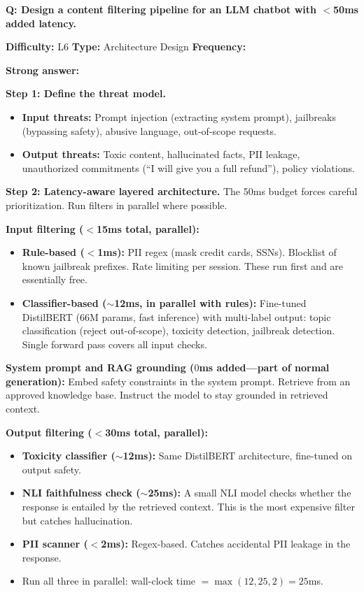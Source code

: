 \begin{interviewq}
\textbf{Q: Design a content filtering pipeline for an LLM chatbot with $<$50ms added latency.}

\textbf{Difficulty:} L6 \quad \textbf{Type:} Architecture Design \quad \textbf{Frequency:} \freqhigh{}

\textbf{Strong answer:}

\textbf{Step 1: Define the threat model.}
\begin{itemize}
    \item \textbf{Input threats:} Prompt injection (extracting system prompt), jailbreaks (bypassing safety), abusive language, out-of-scope requests.
    \item \textbf{Output threats:} Toxic content, hallucinated facts, PII leakage, unauthorized commitments (``I will give you a full refund''), policy violations.
\end{itemize}

\textbf{Step 2: Latency-aware layered architecture.} The 50ms budget forces careful prioritization. Run filters in parallel where possible.

\textbf{Input filtering ($<$15ms total, parallel):}
\begin{itemize}
    \item \textbf{Rule-based ($<$1ms):} PII regex (mask credit cards, SSNs). Blocklist of known jailbreak prefixes. Rate limiting per session. These run first and are essentially free.
    \item \textbf{Classifier-based ($\sim$12ms, in parallel with rules):} Fine-tuned DistilBERT (66M params, fast inference) with multi-label output: topic classification (reject out-of-scope), toxicity detection, jailbreak detection. Single forward pass covers all input checks.
\end{itemize}

\textbf{System prompt and RAG grounding ($0$ms added---part of normal generation):} Embed safety constraints in the system prompt. Retrieve from an approved knowledge base. Instruct the model to stay grounded in retrieved context.

\textbf{Output filtering ($<$30ms total, parallel):}
\begin{itemize}
    \item \textbf{Toxicity classifier ($\sim$12ms):} Same DistilBERT architecture, fine-tuned on output safety.
    \item \textbf{NLI faithfulness check ($\sim$25ms):} A small NLI model checks whether the response is entailed by the retrieved context. This is the most expensive filter but catches hallucination.
    \item \textbf{PII scanner ($<$2ms):} Regex-based. Catches accidental PII leakage in the response.
    \item Run all three in parallel: wall-clock time $= \max(12, 25, 2) = 25$ms.
\end{itemize}


\end{interviewq}

